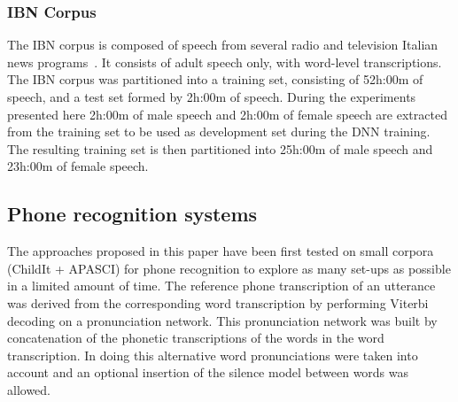 \documentclass{nle}
\begin{document}
\subsubsection{IBN Corpus}
The IBN corpus is composed of speech from several radio and television
Italian news programs~\citep{GerGiuBru09}. It consists of adult speech
only, with word-level transcriptions. The IBN corpus was  partitioned into a training set, consisting
of 52h:00m of speech, and a test set formed by 2h:00m of speech. During the experiments presented here 2h:00m of male speech and 2h:00m of female speech are extracted from the training set to be used as development set during the DNN training. The resulting training set is then partitioned into 25h:00m of male speech and 23h:00m of female speech.


\subsection{Phone recognition systems}
The approaches proposed in this paper have been first tested on small
corpora (ChildIt + APASCI) for phone recognition to explore as many
set-ups as possible in a limited amount of time.  The
reference phone transcription of an utterance was derived from the
corresponding word transcription by performing Viterbi decoding on a
pronunciation network.  This pronunciation network was built by
concatenation of the phonetic transcriptions of the words in the word
transcription.  In doing this alternative word pronunciations were
taken into account and an optional insertion of the silence model
between words was allowed.
\end{document}

